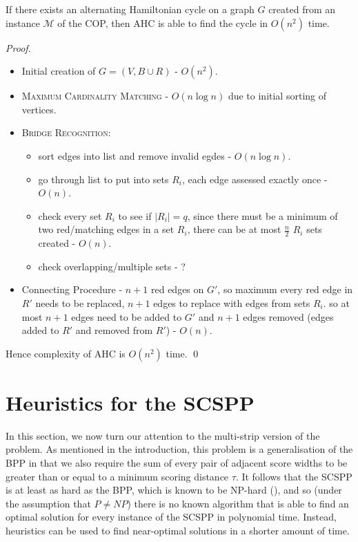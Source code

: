 \documentclass[oribibl]{llncs}
\begin{document}
\begin{theorem}
	\label{thm:copsoln}
	If there exists an alternating Hamiltonian cycle on a graph $G$ created from an instance $\mathcal{M}$ of the COP, then AHC is able to find the cycle in $O(n^2)$ time.
\end{theorem}
\begin{proof}
	\begin{itemize}
		\item Initial creation of $G = (V, B \cup R)$ - $O(n^2)$.
		\item \textsc{Maximum Cardinality Matching} - $O(n\log n)$ due to initial sorting of vertices.
		\item \textsc{Bridge Recognition}:
		\begin{itemize}
			\item sort edges into list and remove invalid egdes - $O(n \log n)$.
			\item go through list to put into sets $R_i$, each edge assessed exactly once - $O(n)$.
			\item check every set $R_i$ to see if $|R_i| = q$, since there must be a minimum of two red/matching edges in a set $R_i$, there can be at most $\frac{n}{2}$ $R_i$ sets created - $O(n)$.
			\item check overlapping/multiple sets - ?
		\end{itemize}	
		\item Connecting Procedure - $n+1$ red edges on $G'$, so maximum every red edge in $R'$ needs to be replaced, $n+1$ edges to replace with edges from sets $R_i$. so at most $n+1$ edges need to be added to $G'$ and $n+1$ edges removed (edges added to $R'$ and removed from $R'$) - $O(n)$.
	\end{itemize}
	Hence complexity of AHC is $O(n^2)$ time.
	\qed
\end{proof}


\section{Heuristics for the SCSPP}
\label{sec:scsppsoln}

In this section, we now turn our attention to the multi-strip version of the problem. As mentioned in the introduction, this problem is a generalisation of the BPP in that we also require the sum of every pair of adjacent score widths to be greater than or equal to a minimum scoring distance $\tau$. It follows that the SCSPP is at least as hard as the BPP, which is known to be NP-hard (\citealp{garey1979}), and so (under the assumption that $P \neq NP$) there is no known algorithm that is able to find an optimal solution for every instance of the SCSPP in polynomial time. Instead, heuristics can be used to find near-optimal solutions in a shorter amount of time.
\end{document}
